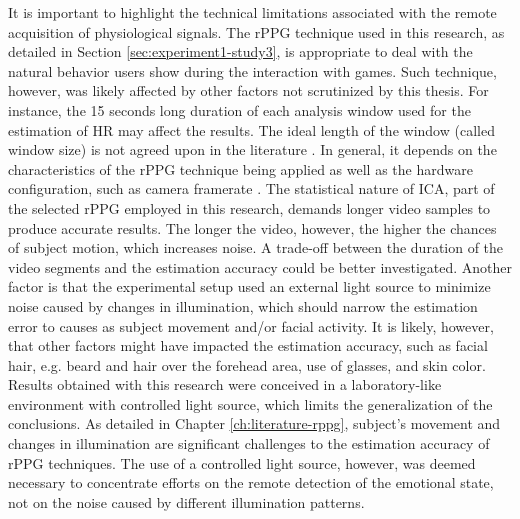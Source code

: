 It is important to highlight the technical limitations associated with the remote acquisition of physiological signals. The rPPG technique used in this research, as detailed in Section \ref{sec:experiment1-study3}, is appropriate to deal with the natural behavior users show during the interaction with games. Such technique, however, was likely affected by other factors not scrutinized by this thesis. For instance, the 15 seconds long duration of each analysis window used for the estimation of HR may affect the results. The ideal length of the window (called window size) is not agreed upon in the literature \parencite{rouast2016remote}. In general, it depends on the characteristics of the rPPG technique being applied as well as the hardware configuration, such as camera framerate \parencite{roald2013estimation}. The statistical nature of ICA, part of the selected rPPG employed in this research, demands longer video samples to produce accurate results. The longer the video, however, the higher the chances of subject motion, which increases noise. A trade-off between the duration of the video segments and the estimation accuracy could be better investigated. Another factor is that the experimental setup used an external light source to minimize noise caused by changes in illumination, which should narrow the estimation error to causes as subject movement and/or facial activity. It is likely, however, that other factors might have impacted the estimation accuracy, such as facial hair, e.g. beard and hair over the forehead area, use of glasses, and skin color. Results obtained with this research were conceived in a laboratory-like environment with controlled light source, which limits the generalization of the conclusions. As detailed in Chapter \ref{ch:literature-rppg}, subject's movement and changes in illumination are significant challenges to the estimation accuracy of rPPG techniques. The use of a controlled light source, however, was deemed necessary to concentrate efforts on the remote detection of the emotional state, not on the noise caused by different illumination patterns.

